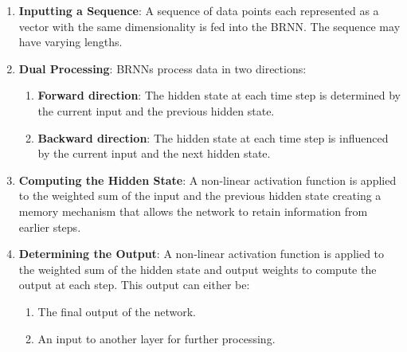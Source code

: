 \begin{enumerate}
    \item \textbf{Inputting a Sequence}: A sequence of data points each represented as a vector with the same dimensionality is fed into the BRNN. 
    The sequence may have varying lengths.
    \hfill \cite{geeksforgeeks/deep-learning/bidirectional-recurrent-neural-network}

    \item \textbf{Dual Processing}: BRNNs process data in two directions:
    \hfill \cite{geeksforgeeks/deep-learning/bidirectional-recurrent-neural-network}
    \begin{enumerate}
        \item \textbf{Forward direction}: The hidden state at each time step is determined by the current input and the previous hidden state.
        \hfill \cite{geeksforgeeks/deep-learning/bidirectional-recurrent-neural-network}
    
        \item \textbf{Backward direction}: The hidden state at each time step is influenced by the current input and the next hidden state.
        \hfill \cite{geeksforgeeks/deep-learning/bidirectional-recurrent-neural-network}
    \end{enumerate}

    \item \textbf{Computing the Hidden State}: A non-linear activation function is applied to the weighted sum of the input and the previous hidden state creating a memory mechanism that allows the network to retain information from earlier steps.
    \hfill \cite{geeksforgeeks/deep-learning/bidirectional-recurrent-neural-network}

    \item \textbf{Determining the Output}: A non-linear activation function is applied to the weighted sum of the hidden state and output weights to compute the output at each step. 
    This output can either be:
    \hfill \cite{geeksforgeeks/deep-learning/bidirectional-recurrent-neural-network}
    \begin{enumerate}
        \item The final output of the network.
        \hfill \cite{geeksforgeeks/deep-learning/bidirectional-recurrent-neural-network}
    
        \item An input to another layer for further processing.
        \hfill \cite{geeksforgeeks/deep-learning/bidirectional-recurrent-neural-network}
    \end{enumerate}
\end{enumerate}




